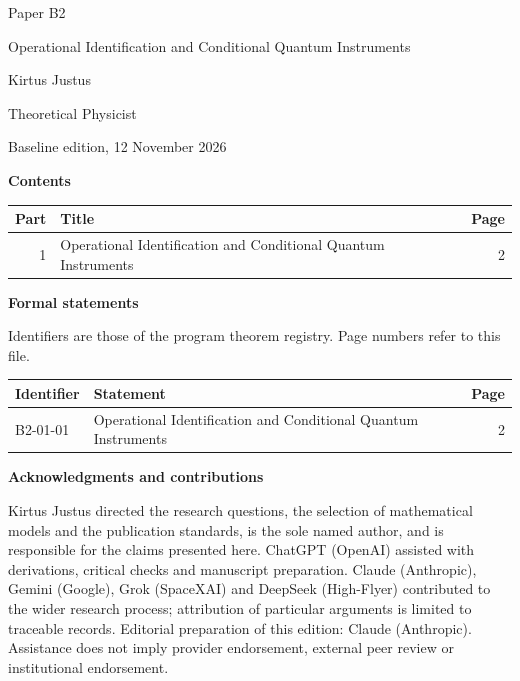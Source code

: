 \documentclass[11pt,a4paper]{article}
\begin{document}
\thispagestyle{empty}\pagestyle{empty}
{\small\sffamily \ProgramTitle\hfill Paper B2\par}
\vspace*{12mm}
{\LARGE\bfseries\raggedright{} Operational Identification and Conditional Quantum Instruments\par}
\vspace{9mm}
{\large Kirtus Justus\par}\vspace{1mm}Theoretical Physicist\par\AuthorLocation\par\vspace{2mm}Baseline edition, 12 November 2026\par\vspace{8mm}
\textbf{Contents}\par\vspace{1mm}
{\small\begin{longtable}{@{}r>{\raggedright\arraybackslash}p{}r@{}}
\toprule Part & Title & Page\\\midrule\endhead
1 & Operational Identification and Conditional Quantum Instruments & 2\\
\bottomrule\end{longtable}}
\vspace{2mm}\textbf{Formal statements}\par\vspace{1mm}
{\footnotesize Identifiers are those of the program theorem registry. Page numbers refer to this file.\par}
{\footnotesize\begin{longtable}{@{}l>{\raggedright\arraybackslash}p{}r@{}}
\toprule Identifier & Statement & Page\\\midrule\endhead
B2-01-01 & Operational Identification and Conditional Quantum Instruments & 2\\
\bottomrule\end{longtable}}
\vspace{3mm}\textbf{Acknowledgments and contributions}\par
{\small Kirtus Justus directed the research questions, the selection of mathematical models and the publication standards, is the sole named author, and is responsible for the claims presented here. ChatGPT (OpenAI) assisted with derivations, critical checks and manuscript preparation. Claude (Anthropic), Gemini (Google), Grok (SpaceXAI) and DeepSeek (High-Flyer) contributed to the wider research process; attribution of particular arguments is limited to traceable records. Editorial preparation of this edition: Claude (Anthropic). Assistance does not imply provider endorsement, external peer review or institutional endorsement.\par}
\end{document}
